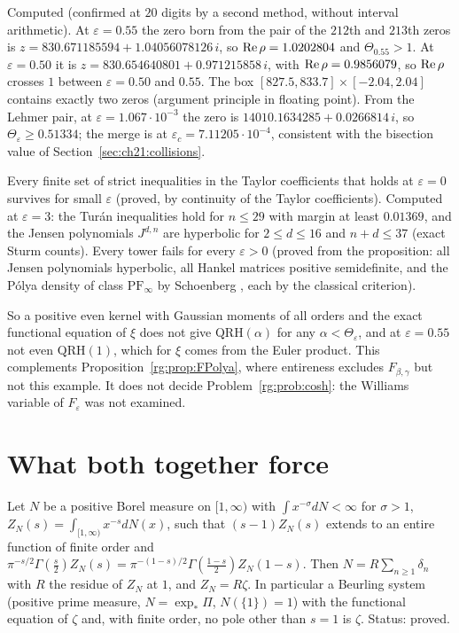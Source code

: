 Computed (confirmed at $20$ digits by a second method, without interval arithmetic). At $\varepsilon=0.55$ the zero born from the pair of the $212$th and $213$th zeros is $z=830.671185594+1.04056078126\,i$, so $\operatorname{Re}\rho=1.0202804$ and $\Theta_{0.55}>1$. At $\varepsilon=0.50$ it is $z=830.654640801+0.971215858\,i$, with $\operatorname{Re}\rho=0.9856079$, so $\operatorname{Re}\rho$ crosses $1$ between $\varepsilon=0.50$ and $0.55$. The box $[827.5,833.7]\times[-2.04,2.04]$ contains exactly two zeros (argument principle in floating point). From the Lehmer pair, at $\varepsilon=1.067\cdot10^{-3}$ the zero is $14010.1634285+0.0266814\,i$, so $\Theta_\varepsilon\ge0.51334$; the merge is at $\varepsilon_c=7.11205\cdot10^{-4}$, consistent with the bisection value of Section~\ref{sec:ch21:collisions}.

Every finite set of strict inequalities in the Taylor coefficients that holds at $\varepsilon=0$ survives for small $\varepsilon$ (proved, by continuity of the Taylor coefficients). Computed at $\varepsilon=3$: the Tur\'an inequalities hold for $n\le29$ with margin at least $0.01369$, and the Jensen polynomials $J^{d,n}$ are hyperbolic for $2\le d\le16$ and $n+d\le37$ (exact Sturm counts). Every tower fails for every $\varepsilon>0$ (proved from the proposition: all Jensen polynomials hyperbolic, all Hankel matrices positive semidefinite, and the P\'olya density of class $\mathrm{PF}_\infty$ by Schoenberg \cite{Schoenberg51}, each by the classical criterion).

So a positive even kernel with Gaussian moments of all orders and the exact functional equation of $\xi$ does not give $\mathrm{QRH}(\alpha)$ for any $\alpha<\Theta_\varepsilon$, and at $\varepsilon=0.55$ not even $\mathrm{QRH}(1)$, which for $\xi$ comes from the Euler product. This complements Proposition~\ref{rg:prop:FPolya}, where entireness excludes $F_{\beta,\gamma}$ but not this example. It does not decide Problem~\ref{rg:prob:cosh}: the Williams variable of $F_\varepsilon$ was not examined.

\section{What both together force}\label{rg:sec:both}

\begin{theorem}\label{rg:thm:A}
Let $N$ be a positive Borel measure on $[1,\infty)$ with $\int x^{-\sigma}dN<\infty$ for $\sigma>1$, $Z_N(s)=\int_{[1,\infty)}x^{-s}dN(x)$, such that $(s-1)Z_N(s)$ extends to an entire function of finite order and $\pi^{-s/2}\Gamma(\frac s2)Z_N(s)=\pi^{-(1-s)/2}\Gamma(\frac{1-s}2)Z_N(1-s)$. Then $N=R\sum_{n\ge1}\delta_n$ with $R$ the residue of $Z_N$ at $1$, and $Z_N=R\zeta$. In particular a Beurling system (positive prime measure, $N=\exp_*\Pi$, $N(\{1\})=1$) with the functional equation of $\zeta$ and, with finite order, no pole other than $s=1$ is $\zeta$. Status: proved.
\end{theorem}

